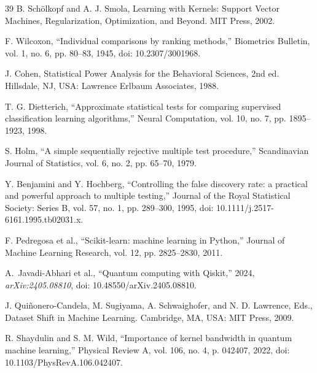 \begin{thebibliography}{39}
B. Sch\"olkopf and A. J. Smola, Learning with Kernels: Support Vector Machines, Regularization, Optimization, and Beyond. MIT Press, 2002.

F. Wilcoxon, ``Individual comparisons by ranking methods,'' Biometrics Bulletin, vol. 1, no. 6, pp. 80--83, 1945, doi: 10.2307/3001968.

J. Cohen, Statistical Power Analysis for the Behavioral Sciences, 2nd ed. Hillsdale, NJ, USA: Lawrence Erlbaum Associates, 1988.

T. G. Dietterich, ``Approximate statistical tests for comparing supervised classification learning algorithms,'' Neural Computation, vol. 10, no. 7, pp. 1895--1923, 1998.

S. Holm, ``A simple sequentially rejective multiple test procedure,'' Scandinavian Journal of Statistics, vol. 6, no. 2, pp. 65--70, 1979.

Y. Benjamini and Y. Hochberg, ``Controlling the false discovery rate: a practical and powerful approach to multiple testing,'' Journal of the Royal Statistical Society: Series B, vol. 57, no. 1, pp. 289--300, 1995, doi: 10.1111/j.2517-6161.1995.tb02031.x.

F. Pedregosa et al., ``Scikit-learn: machine learning in Python,'' Journal of Machine Learning Research, vol. 12, pp. 2825--2830, 2011.

A.~Javadi-Abhari et al., ``Quantum computing with Qiskit,'' 2024, \emph{arXiv:2405.08810}, doi: 10.48550/arXiv.2405.08810.

J. Qui\~nonero-Candela, M. Sugiyama, A. Schwaighofer, and N. D. Lawrence, Eds., Dataset Shift in Machine Learning. Cambridge, MA, USA: MIT Press, 2009.

R. Shaydulin and S. M. Wild, ``Importance of kernel bandwidth in quantum machine learning,'' Physical Review A, vol. 106, no. 4, p. 042407, 2022, doi: 10.1103/PhysRevA.106.042407.

\end{thebibliography}
